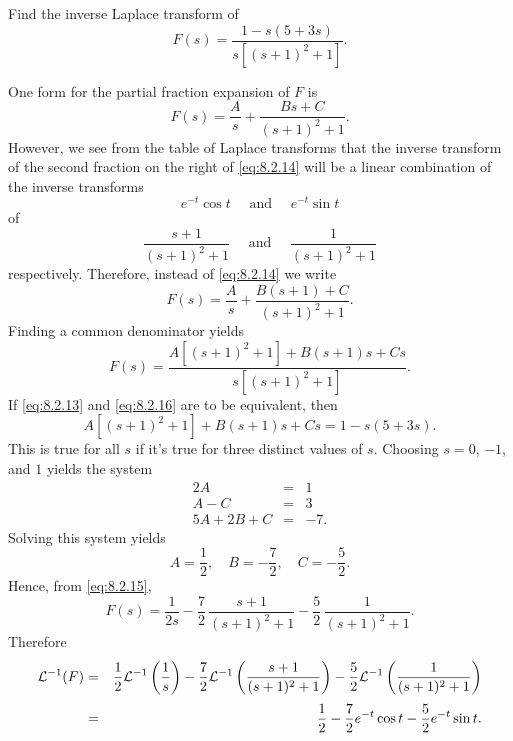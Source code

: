\setcounter{example}{7}
\setcounter{equation}{12}
\begin{example}
  \label{example:8.2.8}\rm %
  Find the inverse Laplace transform of
  \begin{equation}
    \label{eq:8.2.13}F(s)=\frac{1-s(5+3s)}{s\left[(s+1)^{2}+1\right]}.
  \end{equation}
\end{example}
\setcounter{equation}{13}
\begin{examplesolution}
\solution One form for the partial fraction expansion of $F$ is
\begin{equation}
  \label{eq:8.2.14}F(s)=\frac{A}{s}+\frac{Bs+C}{(s+1)^{2}+1}.
\end{equation}
However, we see from the table of Laplace transforms that the inverse transform of the second
fraction on the right of \eqref{eq:8.2.14} will be a linear combination of the inverse transforms
\[
  e^{-t}\cos t\quad\mbox{ and }\quad e^{-t}\sin t
\]
of
\[
  \frac{s+1}{(s+1)^{2}+1}\quad\mbox{ and }\quad\frac{1}{(s+1)^{2}+1}
\]
respectively. Therefore, instead of \eqref{eq:8.2.14} we write
\begin{equation}
  \label{eq:8.2.15}F(s)=\frac{A}{s}+\frac{B(s+1)+C}{(s+1)^{2}+1}.
\end{equation}
Finding a common denominator yields
\begin{equation}
  \label{eq:8.2.16}F(s)=\frac{A\left[(s+1)^{2}+1\right]+B(s+1)s+Cs}{s\left[(s+1)^{2}+1\right]}.
\end{equation}
If \eqref{eq:8.2.13} and \eqref{eq:8.2.16} are to be equivalent, then
\[
  A\left[(s+1)^{2}+1\right]+B(s+1)s+Cs=1-s(5+3s).
\]
This is true for all $s$ if it's true for three distinct values of $s$. Choosing $s=0$, $-1$, and
$1$ yields the system
\[
  \begin{array}{rcr}
    2A      & = & 1\phantom{.} \\
    A-C     & = & 3\phantom{.} \\
    5A+2B+C & = & -7.
  \end{array}
\]
Solving this system yields
\[
  A=\frac{1}{2},\quad B=-\frac{7}{2},\quad C=-\frac{5}{2}.
\]
Hence, from \eqref{eq:8.2.15},
\[
  F(s)=\frac{1}{2s}-\frac{7}{2}\,\frac{s+1}{(s+1)^{2}+1}- \frac{5}{2}\,\frac{1}{(s+1)^{2}+1}.
\]
Therefore
\begin{eqnarray*}
  {\cal L}^{-1}(F) & = & \frac{1}{2}{\cal L}^{-1}\left(\frac{1}{s}\right)-\frac{7}{2}{\cal L}^{-1}\left(\frac{s+1}{(s+1)^{2}+1}\right)-\frac{5}{2}{\cal L}^{-1}\left(\frac{1}{(s+1)^{2}+1}\right) \\[1\jot]
                   & = & \frac{1}{2}-\frac{7}{2}e^{-t}\cos t-\frac{5}{2}e^{-t}\sin t.
\end{eqnarray*}
\end{examplesolution}

